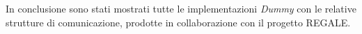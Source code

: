 In conclusione sono stati mostrati tutte le implementazioni \emph{Dummy} con le relative strutture di comunicazione, prodotte in collaborazione con il progetto REGALE.

